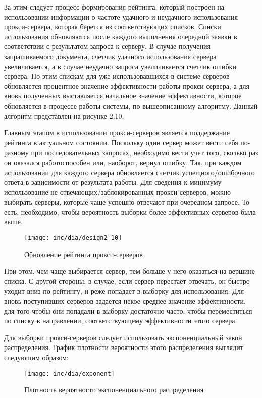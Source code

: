 За этим следует процесс формирования рейтинга, который построен на использовании информации о частоте удачного и неудачного использования прокси-сервера, которая берется из соответствующих списков. Списки использования обновляются после каждого выполнения очередной заявки в соответствии с результатом запроса к серверу. В случае получения запрашиваемого документа, счетчик удачного использования сервера увеличивается, а в случае неудачно запроса увеличивается счетчик ошибки сервера. По этим спискам для уже использовавшихся в системе серверов обновляется процентное значение эффективности работы прокси-сервера, а для вновь полученных выставляется начальное значение эффективности, которое обновляется в процессе работы системы, по вышеописанному алгоритму. Данный алгоритм представлен на рисунке 2.10.

Главным этапом в использовании прокси-серверов является поддержание рейтинга в актуальном состоянии. Поскольку один сервер может вести себя по-разному при последовательных запросах, необходимо вести учет того, сколько раз он оказался работоспособен или, наоборот, вернул ошибку. Так, при каждом использовании для каждого сервера обновляется счетчик успещного/ошибочного ответа в зависимости от результата работы. Для сведения к минимуму использование не отвечающих/заблокированных прокси-серверов, можно выбирать серверы, которые чаще успешно отвечают при очередном запросе. То есть, необходимо, чтобы вероятность выборки более эффективных серверов была выше. 
\begin{figure}
  \centering  
  \texttt{[image: inc/dia/design2-10]}
  \caption{Обновление рейтинга прокси-серверов}
  \label{fig:fig09}
\end{figure}
При этом, чем чаще выбирается сервер, тем больше у него оказаться на вершине списка. С другой стороны, в случае, если сервер перестает отвечать, он быстро уходит вниз по рейтингу, и реже попадает в выборку для использования. Для вновь поступивших серверов задается некое среднее значение эффективности, для того чтобы они попадали в выборку достаточно часто, чтобы переместиться по списку в направлении, соответствующему эффективности этого сервера.

Для выборки прокси-серверов следует использовать экспоненциальный закон распределения. График плотности вероятности этого распределения выглядит следующим образом:

\begin{figure}
  \centering  
  \texttt{[image: inc/dia/exponent]}
  \caption{Плотность вероятности экспоненциального распределения}
  \label{fig:exponent}
\end{figure}

